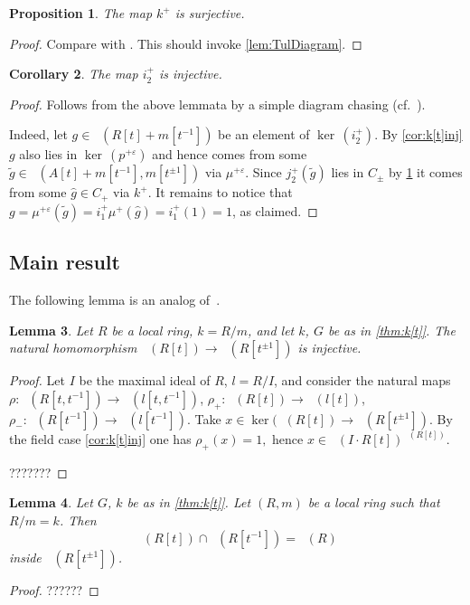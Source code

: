 \documentclass[oneside,12pt]{amsart}
\numberwithin{equation}{section}
\newtheorem{lem}{Lemma}
\numberwithin{lem}{section}
\newtheorem{cor}[lem]{Corollary}
\newtheorem{prop}[lem]{Proposition}
\theoremstyle{definition}
\theoremstyle{remark}
\DeclareMathOperator{\St}{St^G}
\DeclareMathOperator{\Ker}{ker\,}
\begin{document}
\begin{prop} \label{prop:TulKernSurject} The map $k^+$ is surjective. \end{prop}
\begin{proof}
 Compare with \cite[Proposition~4.1]{Tu}. This should invoke \cref{lem:TulDiagram}. 
\end{proof}

\begin{cor} \label{cor:TulInj} The map $i^+_2$ is injective. \end{cor}
\begin{proof}
 Follows from the above lemmata by a simple diagram chasing (cf.~\cite[Cor.~4.2]{Tu}).
 
 Indeed, let $g \in \St(R[t] + m[t^{-1}])$ be an element of $\Ker(i_2^+)$.
 By \cref{cor:k[t]inj} $g$ also lies in $\Ker(p^{+\varepsilon})$ and hence comes from some $\widetilde{g} \in \St(A[t]+m[t^{-1}], m[t^{\pm 1}])$ via $\mu^{+\varepsilon}$.
 Since $j^+_2(\widetilde{g})$ lies in $C_\pm$ by \cref{prop:TulKernSurject} it comes from some $\widehat{g} \in C_+$ via $k^+$.
 It remains to notice that $g = \mu^{+\varepsilon}(\widetilde{g}) = i_1^+\mu^+(\widehat{g}) = i_1^+(1) = 1$, as claimed. 
\end{proof}

\subsection{Main result}

The following lemma is an analog of~\cite[Proposition 4.3 (a)]{Tu}.

\begin{lem}
Let $R$ be a local ring, $k=R/m$, and let $k$, $G$ be as in \cref{thm:k[t]}.
The natural homomorphism $\St(R[t])\to\St(R[t^{\pm 1}])$ is injective.
\end{lem}
\begin{proof}
Let $I$ be the maximal ideal of $R$,
$l=R/I$, and consider the natural maps $\rho:\St(R[t,t^{-1}])\to \St(l[t,t^{-1}])$,
$\rho_+:\St(R[t])\to \St(l[t])$, $\rho_-:\St(R[t^{-1}])\to\St(l[t^{-1}])$.
Take $x\in \ker(\St(R[t])\to\St(R[t^{\pm 1}])$.
By the field case \cref{cor:k[t]inj} one has
$\rho_+(x)=1,$ hence $x\in\St(I\cdot R[t])^{\St(R[t])}$.

???????
\end{proof}

\begin{lem}
Let $G$, $k$ be as in \cref{thm:k[t]}.
Let $(R,m)$ be a local ring such that $R/m=k$.
Then
$$\St(R[t])\cap \St(R[t^{-1}])=\St(R)$$
inside $\St(R[t^{\pm 1}])$.
\end{lem}
\begin{proof}
??????
\end{proof}
\end{document}
